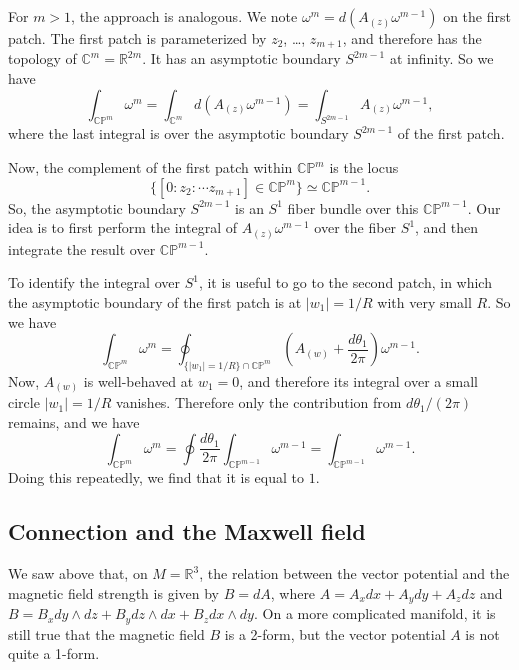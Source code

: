 \documentclass[12pt]{article}
\numberwithin{equation}{section}
\numberwithin{figure}{section}
\theoremstyle{remark}
\def\bC{\mathbb{C}}
\def\bR{\mathbb{R}}
\def\CP{\mathbb{CP}}
\begin{document}
For $m>1$, the approach is analogous. 
We note $\omega^m = d(A_{(z)} \omega^{m-1})$ on the first patch.
The first patch is parameterized by $z_2$, \ldots, $z_{m+1}$,
and therefore has the topology of $\bC^m=\bR^{2m}$.
It has an asymptotic boundary $S^{2m-1}$ at infinity.
So we have \begin{equation}
\int_{\CP^m} \omega^m = \int_{\bC^m} d(A_{(z)} \omega^{m-1}) = \int_{S^{2m-1}} A_{(z)} \omega^{m-1},
\end{equation}
where the last integral is over the asymptotic boundary $S^{2m-1}$ of the first patch.

Now, the complement of the first patch within $\CP^m$ is the locus \begin{equation}
\{ [0:z_2:\cdots z_{m+1}] \in \CP^m \} \simeq \CP^{m-1}.
\end{equation}
So, the asymptotic boundary $S^{2m-1}$ is an $S^1$ fiber bundle over this $\CP^{m-1}$.
Our idea is to first perform the integral of $A_{(z)} \omega^{m-1}$ over the fiber $S^1$, and then integrate the result over $\CP^{m-1}$.

To identify the integral over $S^1$, it is useful to go to the second patch,
in which the asymptotic boundary of the first patch
is at $|w_1|=1/R$ with very small $R$.
So we have  \begin{equation}
\int_{\CP^m} \omega^m = \oint_{\{  |w_1|=1/R  \} \cap \CP^m } 
(A_{(w) } + \frac{d\theta_1}{2\pi} ) \omega^{m-1}.
\end{equation}
Now, $A_{(w)}$ is well-behaved at $w_1=0$, and therefore its integral over a small circle $|w_1|=1/R$ vanishes.
Therefore only the contribution from $d\theta_1/(2\pi)$ remains, and we have \begin{equation}
\int_{\CP^m} \omega^m = \oint \frac{d\theta_1}{2\pi} \int_{\CP^{m-1}} \omega^{m-1}
= \int_{\CP^{m-1}} \omega^{m-1}.
\end{equation}
Doing this repeatedly, we find that it is equal to $1$.



\subsection{Connection and the Maxwell field}
\label{subsec:U1connection-as-Maxwell}

We saw above that, on $M=\bR^3$, the relation between the vector potential and the magnetic field strength is given by $B=dA$,
where $A=A_x dx + A_y dy + A_z dz$ and $B=B_x dy\wedge dz + B_y dz\wedge dx + B_z dx\wedge dy$.
On a more complicated manifold, it is still true that the magnetic field $B$ is a 2-form,
but the vector potential $A$ is not quite a 1-form.
\end{document}
